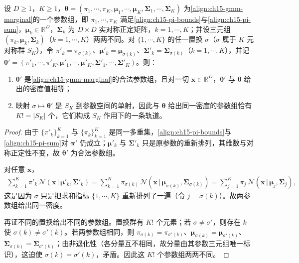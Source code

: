 \documentclass[../../main.tex]{subfiles}
\begin{document}
\begin{proposition}\label{proposition:ch15-交换对称性}
设 $D\geqslant1$，$K\geqslant1$，$\bm{\theta}=(\pi_1,\cdots,\pi_K,\bm{\mu}_1,\cdots,\bm{\mu}_K,\bm{\Sigma}_1,\cdots,\bm{\Sigma}_K)$ 为\eqref{align:ch15-gmm-marginal}的一个参数组，即 $\pi_1,\cdots,\pi_K$ 满足\eqref{align:ch15-pi-bounds}与\eqref{align:ch15-pi-sum}，$\bm{\mu}_k\in\mathbb{R}^{D}$，$\bm{\Sigma}_k$ 为 $D\times D$ 实对称正定矩阵，$k=1,\cdots,K$；并设三元组 $(\pi_k,\bm{\mu}_k,\bm{\Sigma}_k)$（$k=1,\cdots,K$）两两不同。对 $\{1,\cdots,K\}$ 的任一置换 $\sigma$（$\sigma$ 属于 $K$ 元对称群 $S_K$），令 $\pi'_k=\pi_{\sigma(k)}$、$\bm{\mu}'_k=\bm{\mu}_{\sigma(k)}$、$\bm{\Sigma}'_k=\bm{\Sigma}_{\sigma(k)}$（$k=1,\cdots,K$），并记 $\bm{\theta}'=(\pi'_1,\cdots,\pi'_K,\bm{\mu}'_1,\cdots,\bm{\mu}'_K,\bm{\Sigma}'_1,\cdots,\bm{\Sigma}'_K)$。则：
\begin{enumerate}
\item $\bm{\theta}'$ 是\eqref{align:ch15-gmm-marginal}的合法参数组，且对一切 $\bm{x}\in\mathbb{R}^{D}$，$\bm{\theta}'$ 与 $\bm{\theta}$ 给出的密度值相等；
\item 映射 $\sigma\mapsto\bm{\theta}'$ 是 $S_K$ 到参数空间的单射，因此与 $\bm{\theta}$ 给出同一密度的参数组恰有 $K!=|S_K|$ 个，它们构成 $S_K$ 作用下的一条轨道。
\end{enumerate}
\end{proposition}
\begin{proof}
由于 $\{\pi'_k\}_{k=1}^{K}$ 与 $\{\pi_k\}_{k=1}^{K}$ 是同一多重集，\eqref{align:ch15-pi-bounds}与\eqref{align:ch15-pi-sum}对 $\bm{\pi}'$ 仍成立；$\bm{\mu}'_k$ 与 $\bm{\Sigma}'_k$ 只是原参数的重新排列，其维数与对称正定性不变，故 $\bm{\theta}'$ 为合法参数组。

对任意 $\bm{x}$，
\begin{align*}
\sum_{k=1}^{K}\pi'_k\,\mathcal{N}(\bm{x}\,|\,\bm{\mu}'_k,\bm{\Sigma}'_k)
=\sum_{k=1}^{K}\pi_{\sigma(k)}\,\mathcal{N}(\bm{x}\,|\,\bm{\mu}_{\sigma(k)},\bm{\Sigma}_{\sigma(k)})
=\sum_{j=1}^{K}\pi_j\,\mathcal{N}(\bm{x}\,|\,\bm{\mu}_j,\bm{\Sigma}_j),
\end{align*}
这是因为 $\sigma$ 只是把求和指标 $\{1,\cdots,K\}$ 重新排列了一遍（令 $j=\sigma(k)$）。故两参数组给出同一密度。

再证不同的置换给出不同的参数组。置换群有 $K!$ 个元素；若 $\sigma\neq\sigma'$，则存在 $k$ 使 $\sigma(k)\neq\sigma'(k)$。若两参数组相同，则 $\pi_{\sigma(k)}=\pi_{\sigma'(k)}$、$\bm{\mu}_{\sigma(k)}=\bm{\mu}_{\sigma'(k)}$、$\bm{\Sigma}_{\sigma(k)}=\bm{\Sigma}_{\sigma'(k)}$；由非退化性（各分量互不相同，故分量由其参数三元组唯一标识），这迫使 $\sigma(k)=\sigma'(k)$，矛盾。因此这 $K!$ 个参数组两两不同。
\end{proof}
\end{document}

